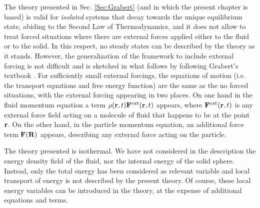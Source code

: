 \documentclass[b5paper,openright,11pt]{book}
\begin{document}
The theory presented in Sec.  \ref{Sec:Grabert} (and in which the present chapter is based) is valid for \textit{isolated}
systems that  decay towards the  unique equilibrium state,  abiding to
the  Second Law  of Thermodynamics,  and it  does not  allow to  treat
forced situations  where there are  external forces applied  either to
the fluid or to  the solid.  In this respect, no  steady states can be
described by the theory as  it stands.  However, the generalization of
the  framework to  include external  forcing is  not difficult  and is
sketched   in   what   follows   by   following   Grabert's   textbook
\cite{Grabert1982}.   For sufficiently  small  external forcings,  the
equations of  motion (i.e.   the transport  equations and  free energy
function) are the same as the  no forced situations, with the external
forcing appearing  in two places.  On  one hand in the  fluid momentum
equation a term $\rho({\bf r},t){\bf F}^{\rm ext}({\bf r},t)$ appears,
where  ${\bf F}^{\rm  ext}({\bf  r},t)$ is  any  external force  field
acting on a  molecule of fluid that  happens to be at  the point ${\bf
  r}$.  On the  other  hand,  in the  particle  momentum equation,  an
additional  force  term ${\bf  F}({\bf  R})$  appears, describing  any
external force acting on the particle.

The theory  presented is  isothermal.  We have  not considered  in the
description the  energy density field  of the fluid, nor  the internal
energy of the  solid sphere.  Instead, only the total  energy has been
considered as relevant  variable and local transport of  energy is not
described  by  the present  theory.   Of  course, these  local  energy
variables  can  be  introduced  in  the  theory,  at  the  expense  of
additional equations and terms.
\end{document}
